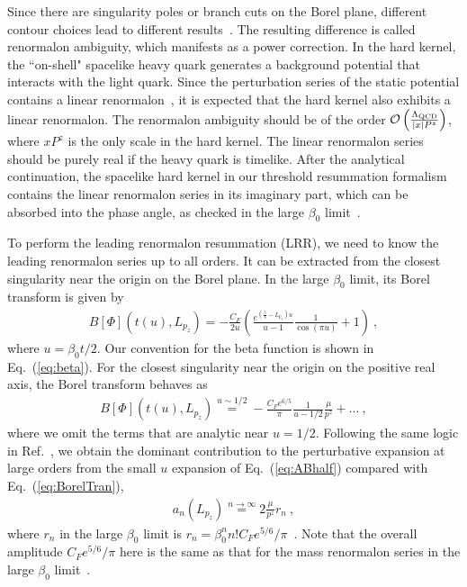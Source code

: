 \documentclass[a4paper,11pt]{article}
\begin{document}
Since there are singularity poles or branch cuts on the Borel plane, different contour choices lead to different results~\cite{Beneke:1994sw, Beneke:1998ui, Beneke:2000kc,Shifman:2013uka}. The resulting difference is called renormalon ambiguity, which manifests as a power correction. In the hard kernel, the ``on-shell" spacelike heavy quark generates a background potential that interacts with the light quark. Since the perturbation series of the static potential contains a linear renormalon~\cite{Pineda:2002se}, it is expected that the hard kernel also exhibits a linear renormalon. The renormalon ambiguity should be of the order $\mathcal{O}\left(\frac{\Lambda_{\rm QCD}}{|x| P^z}\right)$, where $x P^z$ is the only scale in the hard kernel. The linear renormalon series should be purely real if the heavy quark is timelike. After the analytical continuation, the spacelike hard kernel in our threshold resummation formalism contains the linear renormalon series in its imaginary part, which can be absorbed into the phase angle, as checked in the large $\beta_0$ limit~\cite{Liu:2023onm}.

To perform the leading renormalon resummation (LRR), we need to know the leading renormalon series up to all orders. It can be extracted from the closest singularity near the origin on the Borel plane. In the large $\beta_0$ limit, its Borel transform is given by~\cite{Liu:2023onm} 
\begin{align}
B[\Phi](t(u),L_{p_z}) = - \frac{C_F}{2 u} \left( \frac{e^{ \left( \frac{5}{3}-L_{p_z} \right) u}}{u-1}\frac{1}{\cos(\pi u)}+1\right) \ ,
\end{align}
where $u=\beta_0 t/2$. Our convention for the beta function is shown in Eq.~(\ref{eq:beta}). For the closest singularity near the origin on the positive real axis, the Borel transform behaves as
\begin{align}\label{eq:ABhalf}
B[\Phi]\left(t(u), L_{p_z}\right) \stackrel{u \sim 1/2}{=}  -\frac{C_F e^{6/5}}{\pi} \frac{1}{u-1/2} \frac{\mu}{p^z} + ... \ ,
\end{align}
where we omit the terms that are analytic near $u=1/2$. Following the same logic in Ref.~\cite{Pineda:2001zq}, we obtain the dominant contribution to the perturbative expansion at large orders from the small $u$ expansion of Eq.~(\ref{eq:ABhalf}) compared with Eq.~(\ref{eq:BorelTran}),
\begin{align}\label{eq:asymA}
a_n(L_{p_z}) \stackrel{n \rightarrow \infty}{=} 2\frac{\mu}{p^z} r_{n} \ ,
\end{align}
where $r_n$ in the large $\beta_0$ limit is $r_n = \beta_0^n n! C_F e^{5/6}/\pi $~\cite{Liu:2023onm}. Note that the overall amplitude $C_F e^{5/6}/\pi$ here is the same as that for the mass renormalon series in the large $\beta_0$ limit~\cite{Beneke:1994bc,Bigi:1994em,Beneke:1994sw}.
\end{document}
